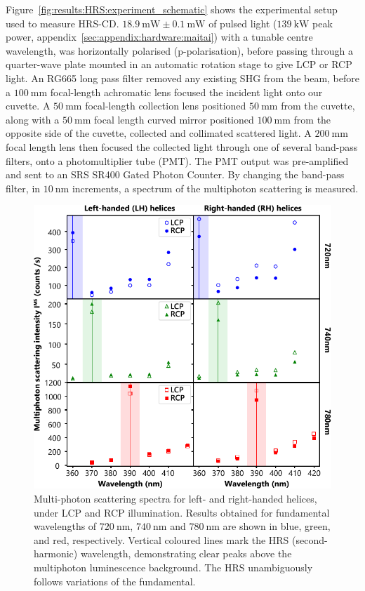 Figure~\ref{fig:results:HRS:experiment_schematic} shows the experimental setup used to measure HRS-CD. 
$\SI{18.9}{\milli\watt}\pm\SI{0.1}{\milli\watt}$ of pulsed light ($\SI{139}{\kilo\watt}$ peak power, appendix~\ref{sec:appendix:hardware:maitai}) with a tunable centre wavelength, was horizontally polarised (p-polarisation), before passing through a quarter-wave plate mounted in an automatic rotation stage to give LCP or RCP light. An RG665 long pass filter removed any existing SHG from the beam, before a $\SI{100}{\milli\m}$ focal-length achromatic lens focused the incident light onto our cuvette. A $\SI{50}{\milli\m}$ focal-length collection lens positioned $\SI{50}{\milli\m}$ from the cuvette, along with a $\SI{50}{\milli\m}$ focal length curved mirror positioned $\SI{100}{\milli\m}$ from the opposite side of the cuvette, collected and collimated scattered light. A $\SI{200}{\milli\m}$ focal length lens then focused the collected light through one of several band-pass filters, onto a photomultiplier tube (PMT). The PMT output was pre-amplified and sent to an SRS SR400 Gated Photon Counter. 
By changing the band-pass filter, in $\SI{10}{\nano\m}$ increments, a spectrum of the multiphoton scattering is measured.

\begin{figure}[htb!]	
    \centering	
    \includegraphics[scale=1]{./figures/results/HRS/hrs_data.pdf}
    \caption{\label{fig:results:HRS:hrs_data}
    Multi-photon scattering spectra for left- and right-handed helices, under LCP and RCP illumination. Results obtained for fundamental wavelengths of $\SI{720}{\nano\m}$, $\SI{740}{\nano\m}$ and $\SI{780}{\nano\m}$ are shown in blue, green, and red, respectively. Vertical coloured lines mark the HRS (second-harmonic) wavelength, demonstrating clear peaks above the multiphoton luminescence background. The HRS unambiguously follows variations of the fundamental. }	
\end{figure}

